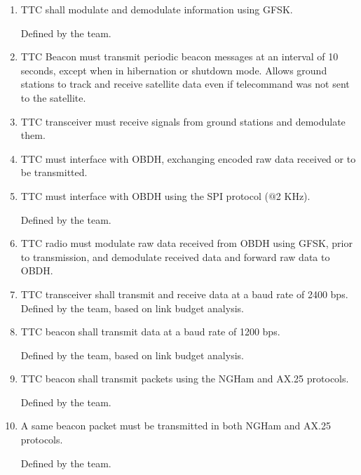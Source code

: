 \documentclass[12pt]{book}
\begin{document}
\begin{enumerate}[label=\textit{TMR \arabic*}, leftmargin=*, align=left]
	\item TTC shall modulate and demodulate information using GFSK.
	
	\begin{footnotesize}
		Defined by the team.
	\end{footnotesize}
	
	\item TTC Beacon must transmit periodic beacon messages at an interval of 10
seconds, except when in hibernation or shutdown mode. Allows ground stations to track and receive satellite data even if telecommand was not sent to the satellite.
	\item TTC transceiver must receive signals from ground stations and demodulate them.
	\item TTC must interface with OBDH, exchanging encoded raw data received or to be transmitted.
	\item TTC must interface with OBDH using the SPI protocol ($@$2 KHz).
	
	\begin{footnotesize}
		Defined by the team.
	\end{footnotesize}
	
	\item TTC radio must modulate raw data received from OBDH using GFSK, prior to transmission, and demodulate received data and forward raw data to OBDH.
	\item TTC transceiver shall transmit and receive data at a baud rate of 2400 bps. Defined by the team, based on link budget analysis.
	\item TTC beacon shall transmit data at a baud rate of 1200 bps.
	
	\begin{footnotesize}
		Defined by the team, based on link budget analysis.
	\end{footnotesize}
	
	\item TTC beacon shall transmit packets using the NGHam and AX.25 protocols.
	
	\begin{footnotesize}
		Defined by the team.
	\end{footnotesize}
	
	\item A same beacon packet must be transmitted in both NGHam and AX.25 protocols.
	
	\begin{footnotesize}
		Defined by the team.
	\end{footnotesize}
	

\end{enumerate}
\end{document}
